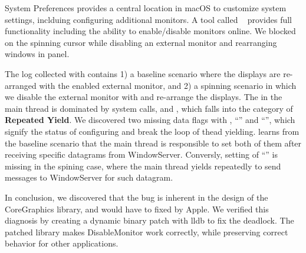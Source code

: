 System Preferences provides a central location in macOS to customize
system settings, inclduing configuring additional monitors. A tool called
~\cite{disablemonitor} provides full functionality including
the ability to enable/disable monitors online. We blocked on the spinning cursor while
disabling an external monitor and rearranging windows in  panel.

The log collected with \xxx contains 1) a baseline scenario where the displays
are re-arranged with the enabled external monitor, and 2) a spinning scenario in
which we disable the external monitor with  and re-arrange
the displays. The \spinningnode in the main thread is dominated by system
calls,  and , which falls into the category of
\textbf{Repeated Yield}. We discovered two missing data flags with ,
``'' and ``'', which
signify the status of configuring and break the loop of thead yielding. \xxx
learns from the baseline scenario that the main thread is responsible to set
both of them after receiving specific datagrams from WindowServer. Conversly,
setting of ``'' is missing in the spining case,
where the main thread yields repeatedly to send messages to WindowServer for
such datagram.

In conclusion, we discovered that the bug is inherent in the design of the
CoreGraphics library, and would have to fixed by Apple. We verified this
diagnosis by creating a dynamic binary patch with lldb to fix the deadlock. The
patched library makes DisableMonitor work correctly, while preserving correct
behavior for other applications.

